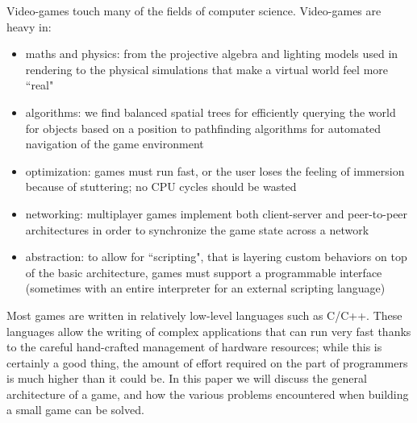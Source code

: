 
Video-games touch many of the fields of computer science. Video-games are heavy in:
\begin{itemize}
\item maths and physics: from the projective algebra and lighting models used in rendering to the physical simulations that make a virtual world feel more ``real"
\item algorithms: we find balanced spatial trees for efficiently querying the world for objects based on a position to pathfinding algorithms for automated navigation of the game environment
\item optimization: games must run fast, or the user loses the feeling of immersion because of stuttering; no CPU cycles should be wasted
\item networking: multiplayer games implement both client-server and peer-to-peer architectures in order to synchronize the game state across a network
\item abstraction: to allow for ``scripting", that is layering custom behaviors on top of the basic architecture, games must support a programmable interface (sometimes with an entire interpreter for an external scripting language)
\end{itemize}
Most games are written in relatively low-level languages such as C/C++. These languages allow the writing of complex applications that can run very fast thanks to the careful hand-crafted management of hardware resources; while this is certainly a good thing, the amount of effort required on the part of programmers is much higher than it could be. In this paper we will discuss the general architecture of a game, and how the various problems encountered when building a small game can be solved.

